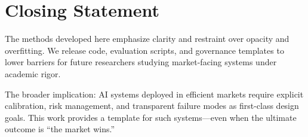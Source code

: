 \section{Closing Statement}

The methods developed here emphasize clarity and restraint over opacity and overfitting. We release code, evaluation scripts, and governance templates to lower barriers for future researchers studying market-facing systems under academic rigor.

The broader implication: AI systems deployed in efficient markets require explicit calibration, risk management, and transparent failure modes as first-class design goals. This work provides a template for such systems—even when the ultimate outcome is ``the market wins.''
